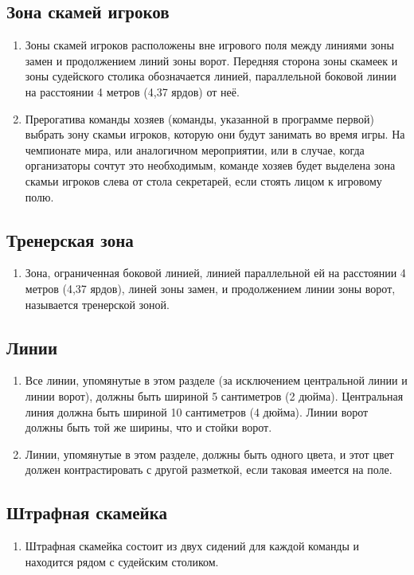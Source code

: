 \documentclass[../main.tex]{subfiles}
\begin{document}
\subsection{Зона скамей игроков}
\begin{enumerate}
  \item Зоны скамей игроков расположены вне игрового поля между линиями зоны замен и продолжением линий зоны ворот.\newline
  Передняя сторона зоны скамеек и зоны судейского столика обозначается линией, параллельной боковой линии на расстоянии 4 метров (4,37 ярдов) от неё.
  \item Прерогатива команды хозяев (команды, указанной в программе первой) выбрать зону скамьи игроков, которую они будут занимать во время игры.\newline
  На чемпионате мира, или аналогичном мероприятии, или в случае, когда организаторы сочтут это необходимым, команде хозяев будет выделена зона скамьи игроков слева от стола секретарей, если стоять лицом к игровому полю.
\end{enumerate}

\subsection{Тренерская зона}
\begin{enumerate}
  \item Зона, ограниченная боковой линией, линией параллельной ей на расстоянии 4 метров (4,37 ярдов), линей зоны замен, и продолжением линии зоны ворот, называется тренерской зоной.
\end{enumerate}

\subsection{Линии}
\begin{enumerate}
  \item Все линии, упомянутые в этом разделе (за исключением центральной линии и линии ворот), должны быть шириной 5 сантиметров (2 дюйма).\newline
  Центральная линия должна быть шириной 10 сантиметров (4 дюйма).\newline
  Линии ворот должны быть той же ширины, что и стойки ворот.
  \item Линии, упомянутые в этом разделе, должны быть одного цвета, и этот цвет должен контрастировать с другой разметкой, если таковая имеется на поле.
\end{enumerate}

\subsection{Штрафная скамейка}
\begin{enumerate}
  \item Штрафная скамейка состоит из двух сидений для каждой команды и находится рядом с судейским столиком.
\end{enumerate}
\end{document}
